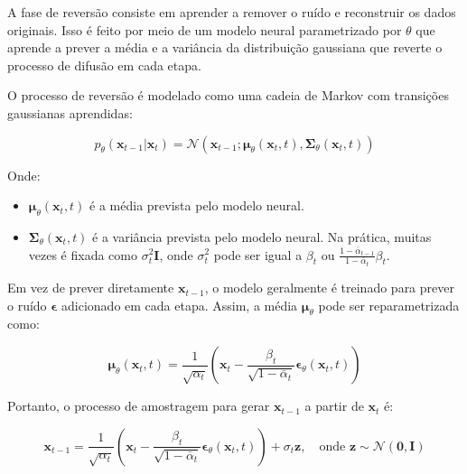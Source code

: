 \documentclass{tufte-handout}
\begin{document}
\begin{defn}
A fase de reversão consiste em aprender a remover o ruído e reconstruir os dados originais. Isso é feito por meio de um modelo neural parametrizado por $\theta$ que aprende a prever a média e a variância da distribuição gaussiana que reverte o processo de difusão em cada etapa.

O processo de reversão é modelado como uma cadeia de Markov com transições gaussianas aprendidas:

\begin{equation}
    p_\theta(\mathbf{x}_{t-1} | \mathbf{x}_t) = \mathcal{N}(\mathbf{x}_{t-1}; \boldsymbol{\mu}_\theta(\mathbf{x}_t, t), \boldsymbol{\Sigma}_\theta(\mathbf{x}_t, t))
\end{equation}

Onde:
\begin{itemize}
    \item $\boldsymbol{\mu}_\theta(\mathbf{x}_t, t)$ é a média prevista pelo modelo neural.
    \item $\boldsymbol{\Sigma}_\theta(\mathbf{x}_t, t)$ é a variância prevista pelo modelo neural. Na prática, muitas vezes é fixada como $\sigma_t^2 \mathbf{I}$, onde $\sigma_t^2$ pode ser igual a $\beta_t$ ou $\frac{1 - \bar{\alpha}_{t-1}}{1 - \bar{\alpha}_t} \beta_t$.
\end{itemize}

Em vez de prever diretamente $\mathbf{x}_{t-1}$, o modelo geralmente é treinado para prever o ruído $\boldsymbol{\epsilon}$ adicionado em cada etapa. Assim, a média $\boldsymbol{\mu}_\theta$ pode ser reparametrizada como:

\begin{equation}
    \boldsymbol{\mu}_\theta(\mathbf{x}_t, t) = \frac{1}{\sqrt{\alpha_t}} \left( \mathbf{x}_t - \frac{\beta_t}{\sqrt{1 - \bar{\alpha}_t}} \boldsymbol{\epsilon}_\theta(\mathbf{x}_t, t) \right)
\end{equation}

Portanto, o processo de amostragem para gerar $\mathbf{x}_{t-1}$ a partir de $\mathbf{x}_t$ é:

\begin{equation}
    \mathbf{x}_{t-1} = \frac{1}{\sqrt{\alpha_t}} \left( \mathbf{x}_t - \frac{\beta_t}{\sqrt{1 - \bar{\alpha}_t}} \boldsymbol{\epsilon}_\theta(\mathbf{x}_t, t) \right) + \sigma_t \mathbf{z}, \quad \text{onde } \mathbf{z} \sim \mathcal{N}(\mathbf{0}, \mathbf{I})
\end{equation}
\end{defn}
\end{document}
